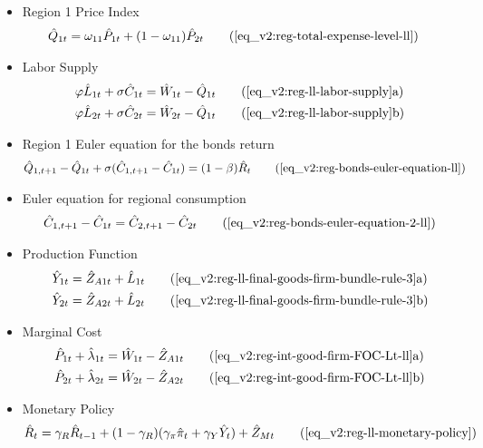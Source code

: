 \documentclass[../thesis.tex]{subfiles}
\begin{document}
{\begin{itemize}
	\item Region 1 Price Index
	\begin{align}
		\hat{Q}_{1t} &= \omega_{11} \hat{P}_{1 t} + (1 -\omega_{11}) \hat{P}_{2 t} \tag{\ref{eq_v2:reg-total-expense-level-ll}}
	\end{align}
	
	\item Labor Supply
	\begin{alignat}{2}
		\varphi \hat{L}_{1 t} + \sigma \hat{C}_{1 t} &= \hat{W}_{1 t} - \hat{Q}_{1t} \tag{\ref{eq_v2:reg-ll-labor-supply}a} \\
		\varphi \hat{L}_{2 t} + \sigma \hat{C}_{2 t} &= \hat{W}_{2 t} - \hat{Q}_{1t} \tag{\ref{eq_v2:reg-ll-labor-supply}b}
	\end{alignat}
	
	\item Region 1 Euler equation for the bonds return
	\begin{align}
		\hat{Q}_{1, t+1} - \hat{Q}_{1t} + \sigma (\hat{C}_{1, t+1} - \hat{C}_{1t}) &= (1 - \beta) \hat{R}_{t} \tag{\ref{eq_v2:reg-bonds-euler-equation-ll}}
	\end{align}
	
	\item Euler equation for regional consumption
	\begin{align}
		\hat{C}_{1, t+1} - \hat{C}_{1t} = \hat{C}_{2, t+1} - \hat{C}_{2t} \tag{\ref{eq_v2:reg-bonds-euler-equation-2-ll}}
	\end{align}
	
	\item Production Function
	\begin{align}
		\hat{Y}_{1 t} &= \hat{Z}_{A1 t} + \hat{L}_{1 t} \tag{\ref{eq_v2:reg-ll-final-goods-firm-bundle-rule-3}a} \\
		\hat{Y}_{2 t} &= \hat{Z}_{A2 t} + \hat{L}_{2 t} \tag{\ref{eq_v2:reg-ll-final-goods-firm-bundle-rule-3}b} 
	\end{align}
	
	\item Marginal Cost
	\begin{align}
		\hat{P}_{1 t} + \hat{\lambda}_{1 t} &= \hat{W}_{1 t} - \hat{Z}_{A1 t} \tag{\ref{eq_v2:reg-int-good-firm-FOC-Lt-ll}a} \\
		\hat{P}_{2 t} + \hat{\lambda}_{2 t} &= \hat{W}_{2 t} - \hat{Z}_{A2 t} \tag{\ref{eq_v2:reg-int-good-firm-FOC-Lt-ll}b}
	\end{align}
	
	\item Monetary Policy
	\begin{align}
		\hat{R}_t = \gamma_{R} \hat{R}_{t-1} + (1-\gamma_{R})(\gamma_{\pi} \hat{\pi}_t + \gamma_{Y} \hat{Y}_t) + \hat{Z}_{Mt} \tag{\ref{eq_v2:reg-ll-monetary-policy}}
	\end{align}
	

\end{itemize}}
\end{document}
